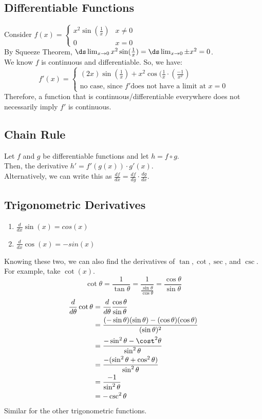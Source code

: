\documentclass{article}
\begin{document}
\subsection{Differentiable Functions}
Consider $f(x) = \begin{cases} 
x^2\sin(\frac{1}{x})& x \neq 0\\
0 & x = 0
\end{cases}$
\\
By Squeeze Theorem, $\ds \lim_{x \to 0} x^2\sin(\frac{1}{x}) = \ds \lim_{x \to 0} \pm x^2 = 0$.\\
We know $f$ is continuous and differentiable. So, we have:
$$f'(x) = \begin{cases} (2x) \sin (\frac{1}{x}) + x^2 \cos(\frac{1}{x} \cdot (\frac{-1}{x^2})\\
\text{no case, since } f' \text{does not have a limit at } x = 0\end{cases}$$
Therefore, a function that is continuous/differentiable everywhere does not necessarily imply $f'$ is continuous.

\subsection{Chain Rule}
Let $f$ and $g$ be differentiable functions and let $h = f \circ g$.\\
Then,  the derivative $h' = f'(g(x)) \cdot g'(x)$.\\
Alternatively, we can write this as $\frac{df}{dx} = \frac{df}{dg} \cdot \frac{dg}{dx}$.

\subsection{Trigonometric Derivatives}
\begin{enumerate}
    \item $\frac{d}{dx}\sin(x) = cos(x)$
    \item $\frac{d}{dx}\cos(x) = -sin(x)$
\end{enumerate}
Knowing these two, we can also find the derivatives of $\tan, \cot, \sec$, and $\csc$.\\
For example, take $\cot(x)$.
$$\cot\theta = \frac{1}{\tan\theta} = \frac{1}{\frac{\sin\theta}{\cos\theta}} = \frac{\cos\theta}{\sin\theta}$$
\begin{align*}
    \frac{d}{d\theta}\cot\theta & = \frac{d}{d\theta} \frac{\cos\theta}{\sin\theta}\\
    & = \frac{(-\sin\theta)(\sin\theta) - (\cos\theta)(\cos \theta)}{(\sin \theta)^2}\\
    & = \frac{-\sin^2\theta - \cost^2\theta}{\sin^2\theta}\\
    & = \frac{-(\sin^2\theta + \cos^2\theta)}{\sin^2\theta}\\
    & = \frac{-1}{\sin^2\theta}\\
    & = -\csc^2\theta
\end{align*}
Similar for the other trigonometric functions.
\end{document}
